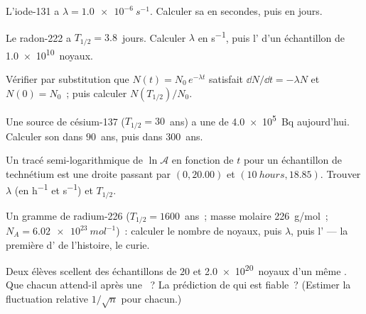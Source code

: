 \begin{exercise}[$\star$]\label{exo:g12:radioactive-decay:1}
L'iode-131 a $\lambda = \qty{1.0e-6}{s^{-1}}$. Calculer sa
 en secondes, puis en jours.
\end{exercise}

\begin{exercise}[$\star$]\label{exo:g12:radioactive-decay:2}
Le radon-222 a $T_{1/2} = 3.8$~jours. Calculer $\lambda$ en
\unit{s^{-1}}, puis l' d'un
échantillon de \num{1.0e10}~noyaux.
\end{exercise}

\begin{exercise}[$\star$]\label{exo:g12:radioactive-decay:3}
Vérifier par substitution que $N(t) = N_0\,e^{-\lambda t}$ satisfait
$\dd N/\dd t = -\lambda N$ et $N(0) = N_0$~; puis calculer
$N(T_{1/2})/N_0$.
\end{exercise}

\begin{exercise}[$\star$]\label{exo:g12:radioactive-decay:4}
Une source de césium-137 ($T_{1/2} = 30$~ans) a une
 de \qty{4.0e5}{Bq} aujourd'hui.
Calculer son  dans $90$~ans, puis
dans $300$~ans.
\end{exercise}

\begin{exercise}[$\star$]\label{exo:g12:radioactive-decay:5}
Un tracé semi-logarithmique de $\ln \mathcal A$ en fonction de $t$
pour un échantillon de technétium est une droite passant par
$(0, 20.00)$ et $(\qty{10}{hours}, 18.85)$. Trouver $\lambda$ (en
\unit{h^{-1}} et \unit{s^{-1}}) et $T_{1/2}$.
\end{exercise}

\begin{exercise}[$\star\star$]\label{exo:g12:radioactive-decay:6}
Un gramme de radium-226 ($T_{1/2} = 1600$~ans~; masse molaire
\qty{226}{g/mol}~; $N_A = \qty{6.02e23}{mol^{-1}}$)~: calculer le
nombre de noyaux, puis $\lambda$, puis
l' --- la première
 d'
de l'histoire, le curie.
\end{exercise}

\begin{exercise}[$\star\star$]\label{exo:g12:radioactive-decay:7}
Deux élèves scellent des échantillons de $20$ et \num{2.0e20}~noyaux
d'un même . Que chacun attend-il
après une ~? La prédiction de qui
est fiable~? (Estimer la fluctuation relative $1/\sqrt n$ pour
chacun.)
\end{exercise}

